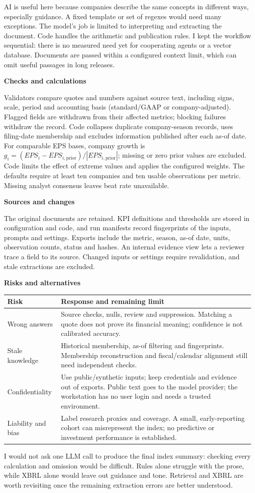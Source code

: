 \documentclass[10pt,a4paper]{article}
\newcommand{\smalltopic}[1]{\par\vspace{3pt}\textbf{#1}\par}
\begin{document}
AI is useful here because companies describe the same concepts in different ways,
especially guidance. A fixed template or set of regexes would need many exceptions.
The model's job is limited to interpreting and extracting the document. Code handles
the arithmetic and publication rules. I kept the workflow sequential: there is no
measured need yet for cooperating agents or a vector database. Documents are passed
within a configured context limit, which can omit useful passages in long releases.

\smalltopic{Checks and calculations}
Validators compare quotes and numbers against source text, including signs, scale,
period and accounting basis (standard/GAAP or company-adjusted). Flagged fields are withdrawn from their affected metrics;
blocking failures withdraw the record. Code collapses duplicate company-season records,
uses filing-date membership and excludes information published after each as-of date.
For comparable EPS bases, company growth is
\(g_i=(EPS_i-EPS_{i,\mathrm{prior}})/|EPS_{i,\mathrm{prior}}|\);
missing or zero prior values are excluded. Code limits the effect of extreme values
and applies the configured weights. The defaults require at least ten companies and ten usable observations
per metric. Missing analyst consensus leaves beat rate unavailable.

\smalltopic{Sources and changes}
The original documents are retained. KPI definitions and thresholds are stored in
configuration and code, and run manifests record fingerprints of the inputs, prompts
and settings. Exports include the metric, season, as-of date, units, observation counts,
status and hashes. An internal evidence view lets a reviewer trace a field to its source.
Changed inputs or settings require revalidation, and stale extractions are excluded.

\smalltopic{Risks and alternatives}
\begin{tabularx}{\linewidth}{@{}p{28mm}Y@{}}
\toprule
\textbf{Risk} & \textbf{Response and remaining limit}\\\midrule
Wrong answers & Source checks, nulls, review and suppression. Matching a quote does not prove its financial meaning; confidence is not calibrated accuracy.\\
Stale knowledge & Historical membership, as-of filtering and fingerprints. Membership reconstruction and fiscal/calendar alignment still need independent checks.\\
Confidentiality & Use public/synthetic inputs; keep credentials and evidence out of exports. Public text goes to the model provider; the workstation has no user login and needs a trusted environment.\\
Liability and bias & Label research proxies and coverage. A small, early-reporting cohort can misrepresent the index; no predictive or investment performance is established.\\
\bottomrule
\end{tabularx}
I would not ask one LLM call to produce the final index summary: checking every
calculation and omission would be difficult. Rules alone struggle with the prose,
while XBRL alone would leave out guidance and tone. Retrieval and XBRL are worth
revisiting once the remaining extraction errors are better understood.
\end{document}
